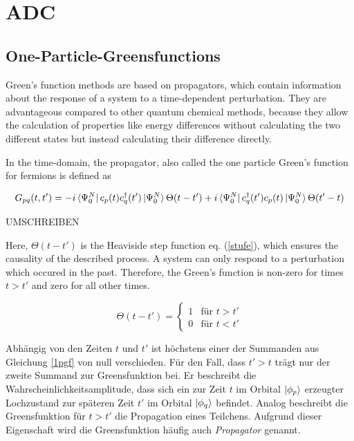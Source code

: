 \chapter{\acl{ADC}}
\section{One-Particle-Greensfunctions}\label{greensfkt}

Green's function methods are based on propagators, which contain information
about the response of a system to a time-dependent perturbation.\cite{McWeeny89}
They are advantageous compared to other quantum chemical methods, because they
allow the calculation of properties like energy differences without calculating
the two different states but instead calculating their difference directly.

In the time-domain, the propagator, also called the one particle Green's function
for fermions is defined as

\begin{equation}\label{1pgf}
G_{pq}(t,t') = -i \bra{\Psi_0^N}c_p(t)c_q^\dagger(t')\ket{\Psi_0^N}\Theta(t-t') +i \bra{\Psi_0^N}c_q^\dagger(t')c_p(t)\ket{\Psi_0^N}\Theta(t'-t)
\end{equation}

UMSCHREIBEN

Here, $\Theta(t-t')$ is the Heaviside step function eq. (\ref{stufe}),
which ensures the causality of the described process. A system can only
respond to a perturbation which occured in the past. Therefore, the Green's
function is non-zero for times $t>t'$ and zero for all other times.

\begin{equation}\label{stufe}
\Theta(t-t') = \begin{cases}
1 & \text{für } t>t'\\
0 & \text{für } t<t'
\end{cases}
\end{equation}

Abhängig von den Zeiten $t$ und $t'$ ist höchstens einer der Summanden aus Gleichung \ref{1pgf} von null verschieden. Für den Fall, dass $t'>t$ trägt nur der zweite Summand zur Greensfunktion bei. Er beschreibt die Wahrscheinlichkeitsamplitude, dass sich ein zur Zeit $t$ im Orbital $\ket{\phi_p}$ erzeugter Lochzustand zur späteren Zeit $t'$ im Orbital $\ket{\phi_q}$ befindet. Analog beschreibt die Greensfunktion für $t>t'$ die Propagation eines Teilchens. Aufgrund dieser Eigenschaft wird die Greensfunktion häufig auch \emph{Propagator} genannt.\cite{nolting7}

